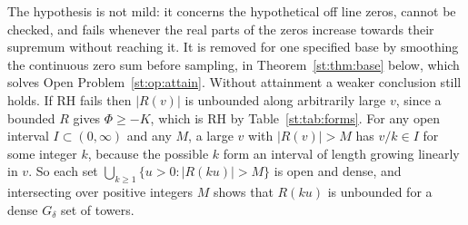 The hypothesis is not mild: it concerns the hypothetical off line zeros, cannot be checked, and fails whenever the real parts of the zeros increase towards their supremum without reaching it. It is removed for one specified base by smoothing the continuous zero sum before sampling, in Theorem~\ref{st:thm:base} below, which solves Open Problem~\ref{st:op:attain}. Without attainment a weaker conclusion still holds. If RH fails then $|R(v)|$ is unbounded along arbitrarily large $v$, since a bounded $R$ gives $\Phi\ge-K$, which is RH by Table~\ref{st:tab:forms}. For any open interval $I\subset(0,\infty)$ and any $M$, a large $v$ with $|R(v)|>M$ has $v/k\in I$ for some integer $k$, because the possible $k$ form an interval of length growing linearly in $v$. So each set $\bigcup_{k\ge1}\{u>0:|R(ku)|>M\}$ is open and dense, and intersecting over positive integers $M$ shows that $R(ku)$ is unbounded for a dense $G_\delta$ set of towers.

